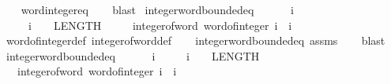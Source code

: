 \begin{isabellebody}
\ \ \isamarkupfalse%
\ word{\isacharunderscore}{\kern0pt}integer{\isacharunderscore}{\kern0pt}eq\isanewline
\ \ \isamarkupfalse%
\ blast%
\endisatagproof
{\isafoldproof}%
%
\isadelimproof
\isanewline
%
\endisadelimproof
\isanewline
{}\isamarkupfalse%
\ integer{\isacharunderscore}{\kern0pt}word{}{\isacharunderscore}{\kern0pt}bounded{\isacharunderscore}{\kern0pt}eq{\isacharcolon}{\kern0pt}\isanewline
\ \ \ \ {\isachardoublequoteopen}{}\ {\isasymle}\ i{\isachardoublequoteclose}\isanewline
\ \ \ \ \ {\isachardoublequoteopen}i\ {\isasymle}\ {}\ {\isacharcircum}{\kern0pt}\ LENGTH{\isacharparenleft}{\kern0pt}{}{\isacharparenright}{\kern0pt}\ {\isacharminus}{\kern0pt}\ {}{\isachardoublequoteclose}\isanewline
\ \ \ {\isachardoublequoteopen}integer{\isacharunderscore}{\kern0pt}of{\isacharunderscore}{\kern0pt}word{}\ {\isacharparenleft}{\kern0pt}word{}{\isacharunderscore}{\kern0pt}of{\isacharunderscore}{\kern0pt}integer\ i{\isacharparenright}{\kern0pt}\ {\isacharequal}{\kern0pt}\ i{\isachardoublequoteclose}\isanewline
%
\isadelimproof
\ \ %
\endisadelimproof
%
\isatagproof
{}\isamarkupfalse%
\ word{}{\isacharunderscore}{\kern0pt}of{\isacharunderscore}{\kern0pt}integer{\isacharunderscore}{\kern0pt}def\ integer{\isacharunderscore}{\kern0pt}of{\isacharunderscore}{\kern0pt}word{}{\isacharunderscore}{\kern0pt}def\isanewline
\ \ \isamarkupfalse%
\ integer{\isacharunderscore}{\kern0pt}word{\isacharunderscore}{\kern0pt}bounded{\isacharunderscore}{\kern0pt}eq\ assms\isanewline
\ \ \isamarkupfalse%
\ blast%
\endisatagproof
{\isafoldproof}%
%
\isadelimproof
\isanewline
%
\endisadelimproof
\isanewline
{}\isamarkupfalse%
\ integer{\isacharunderscore}{\kern0pt}word{}{}{\isacharunderscore}{\kern0pt}bounded{\isacharunderscore}{\kern0pt}eq{\isacharcolon}{\kern0pt}\isanewline
\ \ \ \ {\isachardoublequoteopen}{}\ {\isasymle}\ i{\isachardoublequoteclose}\isanewline
\ \ \ \ \ {\isachardoublequoteopen}i\ {\isasymle}\ {}\ {\isacharcircum}{\kern0pt}\ LENGTH{\isacharparenleft}{\kern0pt}{}{}{\isacharparenright}{\kern0pt}\ {\isacharminus}{\kern0pt}\ {}{\isachardoublequoteclose}\isanewline
\ \ \ {\isachardoublequoteopen}integer{\isacharunderscore}{\kern0pt}of{\isacharunderscore}{\kern0pt}word{}{}\ {\isacharparenleft}{\kern0pt}word{}{}{\isacharunderscore}{\kern0pt}of{\isacharunderscore}{\kern0pt}integer\ i{\isacharparenright}{\kern0pt}\ {\isacharequal}{\kern0pt}\ i{\isachardoublequoteclose}\isanewline

\end{isabellebody}
